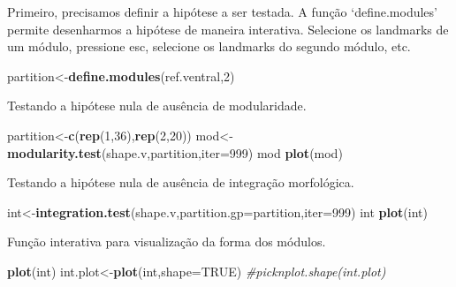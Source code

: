 \documentclass[
]{book}
\newenvironment{Shaded}{\begin{snugshade}}{\end{snugshade}}
\newcommand{\AttributeTok}[1]{\textcolor[rgb]{0.13,0.29,0.53}{#1}}
\newcommand{\CommentTok}[1]{\textcolor[rgb]{0.56,0.35,0.01}{\textit{#1}}}
\newcommand{\ConstantTok}[1]{\textcolor[rgb]{0.56,0.35,0.01}{#1}}
\newcommand{\DecValTok}[1]{\textcolor[rgb]{0.00,0.00,0.81}{#1}}
\newcommand{\FunctionTok}[1]{\textcolor[rgb]{0.13,0.29,0.53}{\textbf{#1}}}
\newcommand{\NormalTok}[1]{#1}
\newcommand{\OtherTok}[1]{\textcolor[rgb]{0.56,0.35,0.01}{#1}}
\begin{document}
Primeiro, precisamos definir a hipótese a ser testada. A função `define.modules' permite desenharmos a hipótese de maneira interativa. Selecione os landmarks de um módulo, pressione esc, selecione os landmarks do segundo módulo, etc.

\begin{Shaded}
\begin{Highlighting}[]
\NormalTok{partition}\OtherTok{\textless{}{-}}\FunctionTok{define.modules}\NormalTok{(ref.ventral,}\DecValTok{2}\NormalTok{)}
\end{Highlighting}
\end{Shaded}

Testando a hipótese nula de ausência de modularidade.

\begin{Shaded}
\begin{Highlighting}[]
\NormalTok{partition}\OtherTok{\textless{}{-}}\FunctionTok{c}\NormalTok{(}\FunctionTok{rep}\NormalTok{(}\DecValTok{1}\NormalTok{,}\DecValTok{36}\NormalTok{),}\FunctionTok{rep}\NormalTok{(}\DecValTok{2}\NormalTok{,}\DecValTok{20}\NormalTok{))}
\NormalTok{mod}\OtherTok{\textless{}{-}}\FunctionTok{modularity.test}\NormalTok{(shape.v,partition,}\AttributeTok{iter=}\DecValTok{999}\NormalTok{) }
\NormalTok{mod}
\FunctionTok{plot}\NormalTok{(mod)}
\end{Highlighting}
\end{Shaded}

Testando a hipótese nula de ausência de integração morfológica.

\begin{Shaded}
\begin{Highlighting}[]
\NormalTok{int}\OtherTok{\textless{}{-}}\FunctionTok{integration.test}\NormalTok{(shape.v,}\AttributeTok{partition.gp=}\NormalTok{partition,}\AttributeTok{iter=}\DecValTok{999}\NormalTok{) }
\NormalTok{int}
\FunctionTok{plot}\NormalTok{(int)}
\end{Highlighting}
\end{Shaded}

Função interativa para visualização da forma dos módulos.

\begin{Shaded}
\begin{Highlighting}[]
\FunctionTok{plot}\NormalTok{(int)}
\NormalTok{int.plot}\OtherTok{\textless{}{-}}\FunctionTok{plot}\NormalTok{(int,}\AttributeTok{shape=}\ConstantTok{TRUE}\NormalTok{)}
\CommentTok{\#picknplot.shape(int.plot)}
\end{Highlighting}
\end{Shaded}
\end{document}
